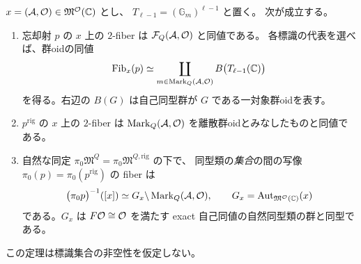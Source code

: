 \begin{theorem}
\label{thm:q-o-fiber-groupoids}
$x=(\mathcal A,\mathcal O)\in\mathfrak M^{\mathcal O}(\mathbb C)$ とし、
$T_{\ell-1}=(\mathbb G_m)^{\ell-1}$ と置く。
次が成立する。
\begin{enumerate}
\item 忘却射 $p$ の $x$ 上の $2$-fiber は
      $\mathcal F_Q(\mathcal A,\mathcal O)$ と同値である。
      各標識の代表を選べば、群oidの同値
      \begin{equation}\label{eq:raw-q-o-fiber}
       \operatorname{Fib}_x(p)
       \simeq
       \coprod_{m\in\operatorname{Mark}_Q(\mathcal A,\mathcal O)}
       B\bigl(T_{\ell-1}(\mathbb C)\bigr)
      \end{equation}
      を得る。右辺の $B(G)$ は自己同型群が $G$ である一対象群oidを表す。
\item $p^{\mathrm{rig}}$ の $x$ 上の $2$-fiber は
      $\operatorname{Mark}_Q(\mathcal A,\mathcal O)$ を離散群oidとみなしたものと同値である。
\item 自然な同定 $\pi_0\mathfrak M^Q=\pi_0\mathfrak M^{Q,\mathrm{rig}}$ の下で、
      同型類の\emph{集合}の間の写像 $\pi_0(p)=\pi_0(p^{\mathrm{rig}})$ の fiber は
      \begin{equation}\label{eq:coarse-q-o-fiber}
       \bigl(\pi_0p\bigr)^{-1}([x])
       \simeq G_x\backslash\operatorname{Mark}_Q(\mathcal A,\mathcal O),
       \qquad
       G_x=\operatorname{Aut}_{\mathfrak M^{\mathcal O}(\mathbb C)}(x)
      \end{equation}
      である。$G_x$ は $F\mathcal O\cong\mathcal O$ を満たす exact 自己同値の自然同型類の群と同型である。
\end{enumerate}
この定理は標識集合の非空性を仮定しない。
\end{theorem}
